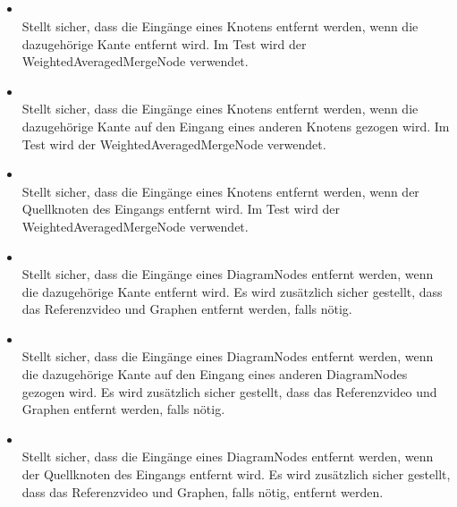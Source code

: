 \subsection{}

\paragraph{}
\begin{itemize}
	\item {} \\
	Stellt sicher, dass die Eingänge eines Knotens entfernt werden, wenn die dazugehörige Kante entfernt wird. Im Test wird der WeightedAveragedMergeNode verwendet.
	\item {} \\
	Stellt sicher, dass die Eingänge eines Knotens entfernt werden, wenn die dazugehörige Kante auf den Eingang eines anderen Knotens gezogen wird. Im Test wird der WeightedAveragedMergeNode verwendet.
	\item {} \\
	Stellt sicher, dass die Eingänge eines Knotens entfernt werden, wenn der Quellknoten des Eingangs entfernt wird. Im Test wird der WeightedAveragedMergeNode verwendet.
	\item {} \\
	Stellt sicher, dass die Eingänge eines DiagramNodes entfernt werden, wenn die dazugehörige Kante entfernt wird. Es wird zusätzlich sicher gestellt, dass das Referenzvideo und Graphen entfernt werden, falls nötig.
	\item {} \\
	Stellt sicher, dass die Eingänge eines DiagramNodes entfernt werden, wenn die dazugehörige Kante auf den Eingang eines anderen DiagramNodes gezogen wird. Es wird zusätzlich sicher gestellt, dass das Referenzvideo und Graphen entfernt werden, falls nötig.
	\item {} \\
	Stellt sicher, dass die Eingänge eines DiagramNodes entfernt werden, wenn der Quellknoten des Eingangs entfernt wird. Es wird zusätzlich sicher gestellt, dass das Referenzvideo und Graphen, falls nötig, entfernt werden.
\end{itemize}
